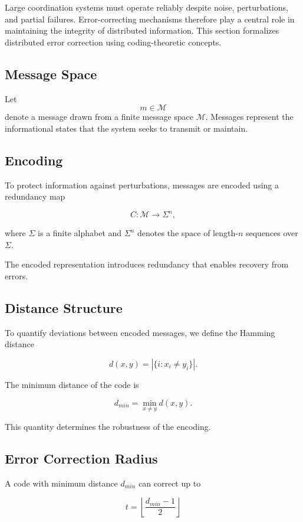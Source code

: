 \documentclass[12pt]{article}
\begin{document}
Large coordination systems must operate reliably despite noise, perturbations, and partial failures. Error-correcting mechanisms therefore play a central role in maintaining the integrity of distributed information. This section formalizes distributed error correction using coding-theoretic concepts.

\subsection{Message Space}

Let
\[
m \in \mathcal{M}
\]
denote a message drawn from a finite message space $\mathcal{M}$. Messages represent the informational states that the system seeks to transmit or maintain.

\subsection{Encoding}

To protect information against perturbations, messages are encoded using a redundancy map

\[
C : \mathcal{M} \rightarrow \Sigma^n,
\]

where $\Sigma$ is a finite alphabet and $\Sigma^n$ denotes the space of length-$n$ sequences over $\Sigma$.

The encoded representation introduces redundancy that enables recovery from errors.

\subsection{Distance Structure}

To quantify deviations between encoded messages, we define the Hamming distance

\[
d(x,y) = |\{i : x_i \neq y_i\}|.
\]

The minimum distance of the code is

\[
d_{min} = \min_{x \neq y} d(x,y).
\]

This quantity determines the robustness of the encoding.

\subsection{Error Correction Radius}

A code with minimum distance $d_{min}$ can correct up to

\[
t = \left\lfloor \frac{d_{min}-1}{2} \right\rfloor
\]
\end{document}
